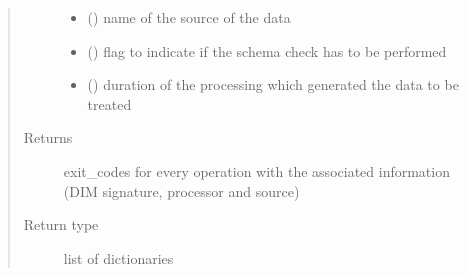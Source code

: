 \begin{fulllineitems}
\begin{fulllineitems}
\begin{quote}
\begin{description}
\begin{itemize}
\item {} 
 () \textendash{} name of the source of the data

\item {} 
 () \textendash{} flag to indicate if the schema check has to be performed

\item {} 
 () \textendash{} duration of the processing which generated the data to be treated

\end{itemize}

\item[{Returns}] \leavevmode
exit\_codes for every operation with the associated information (DIM signature, processor and source)

\item[{Return type}] \leavevmode
list of dictionaries

\end{description}\end{quote}

\end{fulllineitems}


\end{fulllineitems}


